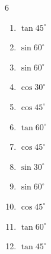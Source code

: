 \begin{multicols}{6}
\begin{enumerate}

  \item $\displaystyle \tan{45^\circ}$

        \phantom{$\displaystyle =1$}

  \item $\displaystyle \sin{60^\circ}$


  \item $\displaystyle \sin{60^\circ}$


  \item $\displaystyle \cos{30^\circ}$


  \item $\displaystyle \cos{45^\circ}$


  \item $\displaystyle \tan{60^\circ}$


  \item $\displaystyle \cos{45^\circ}$


  \item $\displaystyle \sin{30^\circ}$


  \item $\displaystyle \sin{60^\circ}$


  \item $\displaystyle \cos{45^\circ}$


  \item $\displaystyle \tan{60^\circ}$


  \item $\displaystyle \tan{45^\circ}$

        \phantom{$\displaystyle =1$}

\end{enumerate}
\end{multicols}

